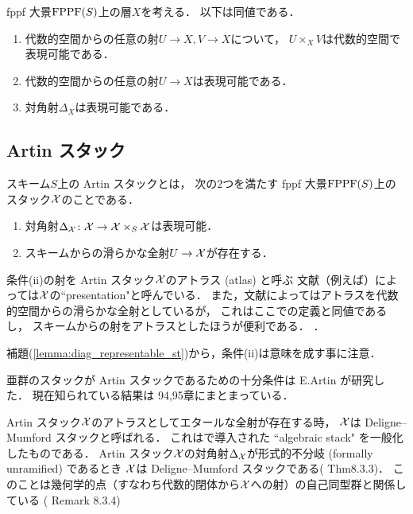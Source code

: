     \begin{Lemma}\label{lemma:diag_representable_st}
        fppf 大景$\mathrm{FPPF}(S)$上の層$X$を考える．
        以下は同値である．
        \begin{enumerate}[label=(\roman*)]
            \item
                代数的空間からの任意の射$U \to X, V \to X$について，
                $U \times_{X} V$は代数的空間で表現可能である．
            \item 代数的空間からの任意の射$U \to X$は表現可能である．
            \item 対角射$\Delta_{X}$は表現可能である．
        \end{enumerate}
    \end{Lemma}

\subsection{Artin スタック}
    \begin{Def}
        スキーム$S$上の Artin スタックとは，
        次の$2$つを満たす fppf 大景$\mathrm{FPPF}(S)$上のスタック$\mathcal{X}$のことである．
        \begin{enumerate}[label=(\roman*)]
            \item 対角射$\Delta_{\mathcal{X}} \colon \mathcal{X} \to \mathcal{X} \times_{S} \mathcal{X}$は表現可能．
            \item スキームからの滑らかな全射$U \to \mathcal{X}$が存在する．
        \end{enumerate}
        条件(ii)の射を Artin スタック$\mathcal{X}$のアトラス (atlas) と呼ぶ
        \tablefootnote
        {
            文献（例えば\cite{LMB}）によっては$\mathcal{X}$の``presentation"と呼んでいる．
            また，文献によってはアトラスを代数的空間からの滑らかな全射としているが，
            これはここでの定義と同値であるし，
            スキームからの射をアトラスとしたほうが便利である．
        }．
    \end{Def}
    補題(\ref{lemma:diag_representable_st})から，条件(ii)は意味を成す事に注意．
    
    \begin{Remark}
        亜群のスタックが Artin スタックであるための十分条件は E.Artin が研究した．
        現在知られている結果は\cite{SP} 94,95章にまとまっている．
    \end{Remark}

    \begin{Remark}
        Artin スタック$\mathcal{X}$のアトラスとしてエタールな全射が存在する時，
        $\mathcal{X}$は Deligne--Mumford スタックと呼ばれる．
        これは\cite{DM69}で導入された ``algebraic stack" を一般化したものである．
        Artin スタック$\mathcal{X}$の対角射$\Delta_{\mathcal{X}}$が形式的不分岐 (formally unramified) であるとき
        $\mathcal{X}$は Deligne--Mumford スタックである(\cite{Olsson16} Thm8.3.3)．
        このことは幾何学的点（すなわち代数的閉体から$\mathcal{X}$への射）の自己同型群と関係している
        (\cite{Olsson16} Remark 8.3.4)
    \end{Remark}

